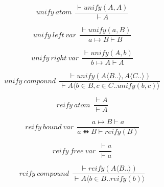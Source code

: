 $$unify \ atom \ \ \frac{⊢unify(A,A)}{⊢A}$$

$$unify \ left \ var \ \ \frac{⊢unify(a,B)}{a↦B⊢B}$$

$$unify \ right \ var \ \ \frac{⊢unify(A,b)}{b↦A⊢A}$$

$$unify \ compound \ \ \frac{⊢unify(A \langle B.. \rangle ,A \langle C.. \rangle)}{⊢A \langle b∈B,c∈C..unify(b,c) \rangle}$$

$$reify \ atom \ \ \frac{⊢A}{⊢A}$$

$$reify \ bound \ var \ \ \frac{a↦B⊢a}{a⇻B⊢reify(B)}$$

$$reify \ free \ var \ \ \frac{⊢a}{⊢a}$$

$$reify \ compound \ \ \frac{⊢reify(A \langle B.. \rangle)}{⊢A \langle b∈B..reify(b) \rangle}$$
